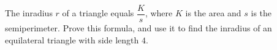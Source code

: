 The inradius $r$ of a triangle equals $\dfrac {K}{s}$, where $K$ is the area and $s$ is the semiperimeter. Prove this formula, and use it to find the inradius of an equilateral triangle with side length $4$.
